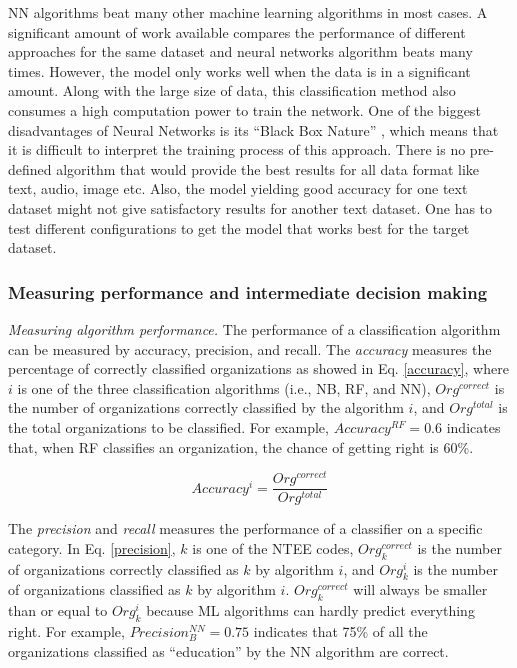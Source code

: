 \documentclass[11pt]{article}
\begin{document}
NN algorithms beat many other machine learning algorithms in most cases. A significant amount of work available compares the performance of different approaches for the same dataset and neural networks algorithm beats many times. However, the model only works well when the data is in a significant amount. Along with the large size of data, this classification method also consumes a high computation power to train the network. One of the biggest disadvantages of Neural Networks is its ``Black Box Nature'' \parencites{BenitezAreartificialneural1997}, which means that it is difficult to interpret the training process of this approach. There is no pre-defined algorithm that would provide the best results for all data format like text, audio, image etc. Also, the model yielding good accuracy for one text dataset might not give satisfactory results for another text dataset. One has to test different configurations to get the model that works best for the target dataset.

\subsubsection{Measuring performance and intermediate decision making}

\textit{Measuring algorithm performance.} The performance of a classification algorithm can be measured by {accuracy}, {precision}, and {recall}. The \textit{accuracy} measures the percentage of correctly classified organizations as showed in Eq. \ref{accuracy}, where $i$ is one of the three classification algorithms (i.e., NB, RF, and NN), $Org^{correct}$ is the number of organizations correctly classified by the algorithm $i$, and $Org^{total}$ is the total organizations to be classified. For example, $Accuracy^{RF}=0.6$ indicates that, when RF classifies an organization, the chance of getting right is 60\%.

\begin{equation} \label{accuracy}
    Accuracy^i=\frac{Org^{correct}}{Org^{total}}
\end{equation}

The \textit{precision} and \textit{recall} measures the performance of a classifier on a specific category. In Eq. \ref{precision}, $k$ is one of the NTEE codes, $Org^{correct}_{k}$ is the number of organizations correctly classified as $k$ by algorithm $i$, and ${Org^{i}_{k}}$ is the number of organizations classified as $k$ by algorithm $i$. $Org^{correct}_{k}$ will always be smaller than or equal to ${Org^{i}_{k}}$ because ML algorithms can hardly predict everything right. For example, $Precision^{NN}_{B}=0.75$ indicates that 75\% of all the organizations classified as ``education'' by the NN algorithm are correct.
\end{document}
